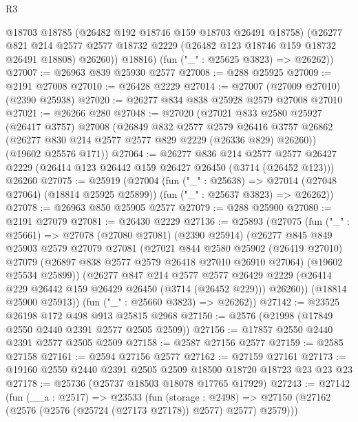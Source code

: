 \begin{lexlean}{R3}
\begin{coremodule}
          @18703
          @18785
          (@26482 @192 @18746 @159 @18703 @26491 @18758)
          (@26277
            @821
            @214
            @2577
            @2577
            @18732
            @2229
            (@26482 @123 @18746 @159 @18732 @26491 @18808)
            @26260))
        @18816)
      (fun ("_" : @25625 @3823) => @26262))
@27007 := @26963 @839 @25930 @2577
@27008 := @288 @25925
@27009 := @2191 @27008
@27010 := @26428 @2229
@27014 := @27007 (@27009 @27010) (@2390 @25938)
@27020 := @26277 @834 @838 @25928 @2579 @27008 @27010
@27021 := @26266 @280
@27048 := @27020
    (@27021
      @833
      @2580
      @25927
      (@26417 @3757)
      @27008
      (@26849
        @832
        @2577
        @2579
        @26416
        @3757
        @26862
        (@26277 @830 @214 @2577 @2577 @829 @2229 (@26336 @829) @26260))
      (@19602 @25576 @171))
@27064 := @26277
    @836
    @214
    @2577
    @2577
    @26427
    @2229
    (@26414 @123 @26442 @159 @26427 @26450 (@3714 (@26452 @123)))
    @26260
@27075 := @25919
    (@27004
      (fun ("_" : @25638) => @27014 (@27048 @27064) (@18814 @25925 @25899))
      (fun ("_" : @25637 @3823) => @26262))
@27078 := @26963 @850 @25905 @2577
@27079 := @288 @25900
@27080 := @2191 @27079
@27081 := @26430 @2229
@27136 := @25893
    (@27075
      (fun ("_" : @25661) =>
      @27078
        (@27080 @27081)
        (@2390 @25914)
        (@26277
          @845
          @849
          @25903
          @2579
          @27079
          @27081
          (@27021
            @844
            @2580
            @25902
            (@26419 @27010)
            @27079
            (@26897 @838 @2577 @2579 @26418 @27010 @26910 @27064)
            (@19602 @25534 @25899))
          (@26277
            @847
            @214
            @2577
            @2577
            @26429
            @2229
            (@26414 @229 @26442 @159 @26429 @26450 (@3714 (@26452 @229)))
            @26260))
        (@18814 @25900 @25913))
      (fun ("_" : @25660 @3823) => @26262))
@27142 := @23525 @26198 @172 @498 @913 @25815 @2968
@27150 := @2576 (@21998 (@17849 @2550 @2440 @2391 @2577 @2505 @2509))
@27156 := @17857 @2550 @2440 @2391 @2577 @2505 @2509
@27158 := @2587 @27156 @2577
@27159 := @2585 @27158
@27161 := @2594 @27156 @2577
@27162 := @27159 @27161
@27173 := @19160 @2550 @2440 @2391 @2505 @2509 @18500 @18720 @18723 @23 @23 @23
@27178 := @25736 (@25737 @18503 @18078 @17765 @17929)
@27243 := @27142
    (fun (__a : @2517) =>
    @23533
      (fun (storage : @2498) =>
      @27150 (@27162 (@2576 (@2576 (@25724 (@27173 @27178)) @2577) @2577) @2579)))

\end{coremodule}
\end{lexlean}
